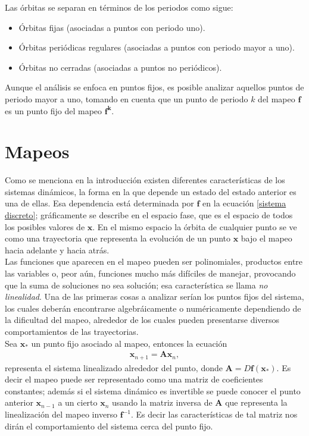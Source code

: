 Las órbitas se separan en términos de los periodos como sigue:

\begin{itemize}
\item  Órbitas fijas (asociadas a puntos con periodo uno).
\item Órbitas periódicas regulares (asociadas a puntos con periodo mayor a uno).
\item Órbitas no cerradas (asociadas a puntos no periódicos).
\end{itemize}
Aunque el análisis se enfoca en puntos fijos, es posible analizar aquellos puntos de periodo mayor a uno, tomando en cuenta que un punto de periodo $k$ del mapeo $\mathbf{f}$ es un punto fijo del mapeo $\mathbf{f^{k}}.$
\section{Mapeos}
Como se menciona en la introducción existen diferentes características de los sis\-te\-mas dinámicos, la forma en la que depende un estado del estado anterior es una de ellas. Esa dependencia está determinada por $\mathbf{f}$ en la ecuación \eqref{sistema discreto}; gráficamente se describe en el espacio fase, que es el espacio de todos los posibles valores de $\pmb x$. En el mismo espacio la órbita de cualquier punto se ve como una trayectoria que representa la evolución de un punto $\pmb x$ bajo el mapeo hacia adelante y hacia atrás. \\

Las funciones que aparecen en el mapeo pueden ser polinomiales, productos entre las variables o, peor aún, funciones mucho más difíciles de manejar, provocando que la suma de soluciones no sea solución; esa característica se llama \textit{no linealidad}. Una de las primeras cosas a analizar serían los puntos fijos del sistema, los cuales deberán encontrarse algebráicamente o numéricamente dependiendo de la dificultad del mapeo, alrededor de los cuales pueden presentarse diversos comportamientos de las trayectorias.\\

Sea $\mathbf{x}_{*}$ un punto fijo asociado al mapeo, entonces la ecuación
\begin{eqnarray}
\mathbf{x}_{n+1} =\mathbf{A}\mathbf{x}_{n},
\end{eqnarray}
representa el sistema linealizado alrededor del punto, donde $\mathbf{A}=D\mathbf{f}(\mathbf{x}_{*})$. Es decir el mapeo puede ser representado como una matriz de coeficientes constantes; además si el sistema dinámico es invertible se puede conocer el punto anterior $\mathbf{x}_{n-1}$ a un cierto $\mathbf{x}_{n}$ usando la matriz inversa de $\mathbf{A}$ que representa la linealización del mapeo inverso $\mathbf{f}^{-1}$. Es decir las características de tal matriz nos dirán el comportamiento del sistema cerca del punto fijo. \\

